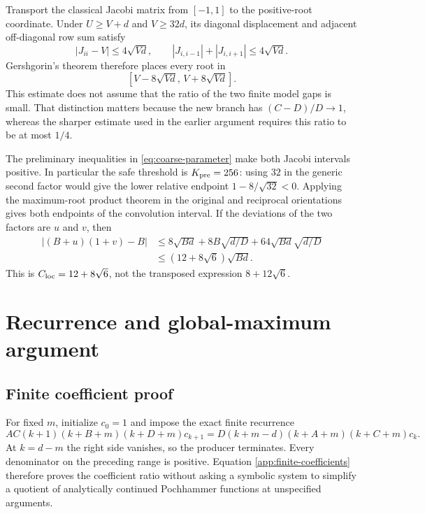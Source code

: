 Transport the classical Jacobi matrix from $[-1,1]$ to the positive-root
coordinate.  Under $U\ge V+d$ and $V\ge32d$, its diagonal displacement and
adjacent off-diagonal row sum satisfy
\[
 |J_{ii}-V|\le4\sqrt{Vd},\qquad
 |J_{i,i-1}|+|J_{i,i+1}|\le4\sqrt{Vd}.
\]
Gershgorin's theorem therefore places every root in
\begin{equation}\label{app:jacobi-eight}
 [V-8\sqrt{Vd},\,V+8\sqrt{Vd}].
\end{equation}
This estimate does not assume that the ratio of the two finite model gaps is
small.  That distinction matters because the new branch has
$(C-D)/D\to1$, whereas the sharper estimate used in the earlier argument
requires this ratio to be at most $1/4$.

The preliminary inequalities in \eqref{eq:coarse-parameter} make both
Jacobi intervals positive.  In particular the safe threshold is
$K_{\rm pre}=256$: using $32$ in the generic second factor would give the
lower relative endpoint $1-8/\sqrt{32}<0$.  Applying the maximum-root
product theorem in the original and reciprocal orientations gives both
endpoints of the convolution interval.  If the deviations of the two
factors are $u$ and $v$, then
\begin{align*}
 |(B+u)(1+v)-B|
 &\le8\sqrt{Bd}+8B\sqrt{d/D}
       +64\sqrt{Bd}\sqrt{d/D}\\
 &\le(12+8\sqrt6)\sqrt{Bd}.
\end{align*}
This is $C_{\rm loc}=12+8\sqrt6$, not the transposed expression
$8+12\sqrt6$.

\section{Recurrence and global-maximum argument}\label{app:recurrence-details}

\subsection{Finite coefficient proof}

For fixed $m$, initialize $c_0=1$ and impose the exact finite recurrence
\begin{equation}\label{app:finite-coefficients}
 AC(k+1)(k+B+m)(k+D+m)c_{k+1}
 =D(k+m-d)(k+A+m)(k+C+m)c_k.
\end{equation}
At $k=d-m$ the right side vanishes, so the producer terminates.  Every
denominator on the preceding range is positive.  Equation
\eqref{app:finite-coefficients} therefore proves the coefficient ratio
without asking a symbolic system to simplify a quotient of analytically
continued Pochhammer functions at unspecified arguments.

